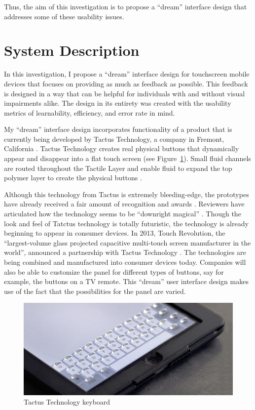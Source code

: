 \documentclass[11pt]{article}
\begin{document}
Thus, the aim of this investigation is to propose a ``dream'' interface design that addresses some of these usability issues.


\section{System Description}
\label{System Description}

In this investigation, I propose a ``dream'' interface design for touchscreen mobile devices that focuses on providing as much as feedback as possible. This feedback is designed in a way that can be helpful for individuals with and without visual impairments alike. The design in its entirety was created with the usability metrics of learnability, efficiency, and error rate in mind.

My ``dream'' interface design incorporates functionality of a product that is currently being developed by Tactus Technology, a company in Fremont, California \cite{Tactus}. Tactus Technology creates real physical buttons that dynamically appear and disappear into a flat touch screen (see Figure~\ref{tactus}). Small fluid channels are routed throughout the Tactile Layer and enable fluid to expand the top polymer layer to create the physical buttons \cite{Tactus}.

Although this technology from Tactus is extremely bleeding-edge, the prototypes have already received a fair amount of recognition and awards \cite{CNN, I-Zone, PCMag, Wired}. Reviewers have articulated how the technology seems to be ``downright magical'' \cite{CNN}. Though the look and feel of Tatctus technology is totally futuristic, the technology is already beginning to appear in consumer devices. In 2013, Touch Revolution, the ``largest-volume glass projected capacitive multi-touch screen manufacturer in the world'', announced a partnership with Tactus Technology \cite{TactusAvailability}. The technologies are being combined and manufactured into consumer devices today. Companies will also be able to customize the panel for different types of buttons, say for example, the buttons on a TV remote. This ``dream'' user interface design makes use of the fact that the possibilities for the panel are varied.

\begin{figure}[ht]
\centering
\includegraphics[width=4.5in]{tactus1.jpg} 
\caption{Tactus Technology keyboard}
\label{tactus}
\end{figure}
\end{document}
